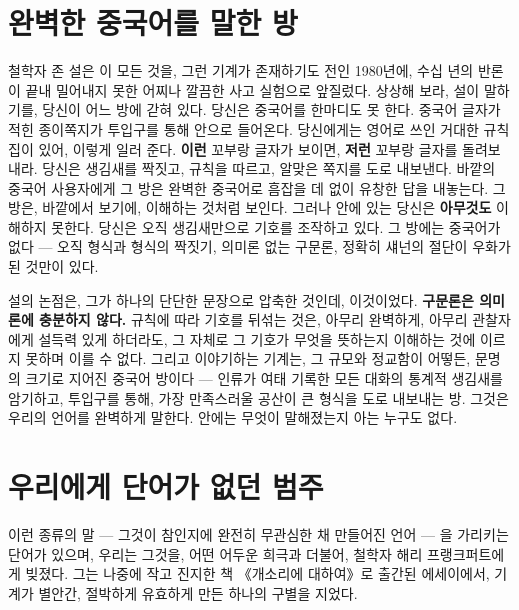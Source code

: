 \section*{완벽한 중국어를 말한 방}

철학자 존 설은 이 모든 것을, 그런 기계가 존재하기도 전인 1980년에, 수십 년의 반론이 끝내 밀어내지 못한 어찌나 깔끔한 사고 실험으로 앞질렀다. 상상해 보라, 설이 말하기를, 당신이 어느 방에 갇혀 있다. 당신은 중국어를 한마디도 못 한다. 중국어 글자가 적힌 종이쪽지가 투입구를 통해 안으로 들어온다. 당신에게는 영어로 쓰인 거대한 규칙집이 있어, 이렇게 일러 준다. \textbf{이런} 꼬부랑 글자가 보이면, \textbf{저런} 꼬부랑 글자를 돌려보내라. 당신은 생김새를 짝짓고, 규칙을 따르고, 알맞은 쪽지를 도로 내보낸다. 바깥의 중국어 사용자에게 그 방은 완벽한 중국어로 흠잡을 데 없이 유창한 답을 내놓는다. 그 방은, 바깥에서 보기에, 이해하는 것처럼 보인다. 그러나 안에 있는 당신은 \textbf{아무것도} 이해하지 못한다. 당신은 오직 생김새만으로 기호를 조작하고 있다. 그 방에는 중국어가 없다 — 오직 형식과 형식의 짝짓기, 의미론 없는 구문론, 정확히 섀넌의 절단이 우화가 된 것만이 있다.

설의 논점은, 그가 하나의 단단한 문장으로 압축한 것인데, 이것이었다. \textbf{구문론은 의미론에 충분하지 않다.} 규칙에 따라 기호를 뒤섞는 것은, 아무리 완벽하게, 아무리 관찰자에게 설득력 있게 하더라도, 그 자체로 그 기호가 무엇을 뜻하는지 이해하는 것에 이르지 못하며 이를 수 없다. 그리고 이야기하는 기계는, 그 규모와 정교함이 어떻든, 문명의 크기로 지어진 중국어 방이다 — 인류가 여태 기록한 모든 대화의 통계적 생김새를 암기하고, 투입구를 통해, 가장 만족스러울 공산이 큰 형식을 도로 내보내는 방. 그것은 우리의 언어를 완벽하게 말한다. 안에는 무엇이 말해졌는지 아는 누구도 없다.

\section*{우리에게 단어가 없던 범주}

이런 종류의 말 — 그것이 참인지에 완전히 무관심한 채 만들어진 언어 — 을 가리키는 단어가 있으며, 우리는 그것을, 어떤 어두운 희극과 더불어, 철학자 해리 프랭크퍼트에게 빚졌다. 그는 나중에 작고 진지한 책 《개소리에 대하여》로 출간된 에세이에서, 기계가 별안간, 절박하게 유효하게 만든 하나의 구별을 지었다.

